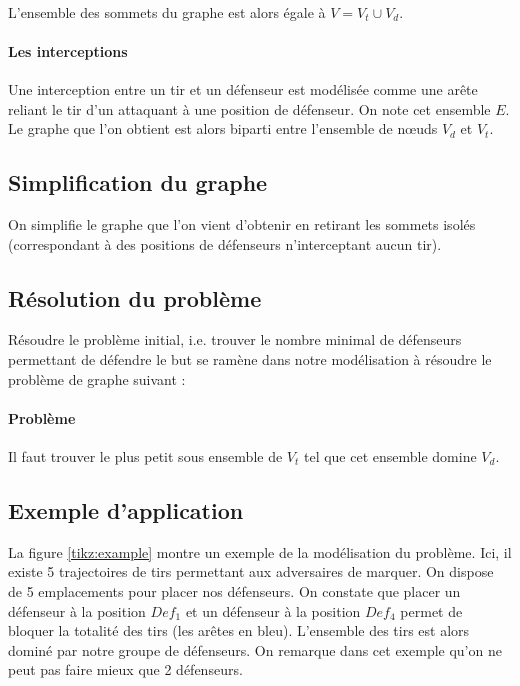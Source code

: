 \documentclass[12pt]{article}
\begin{document}
\paragraph{} L'ensemble des sommets du graphe est alors égale à $V = V_t \cup V_d$.

\paragraph{Les interceptions}
Une interception entre un tir et un défenseur est modélisée comme une arête reliant le tir d'un attaquant à une position de défenseur. On note cet ensemble $E$. Le graphe que l'on obtient est alors biparti entre l'ensemble de n\oe uds $V_d$ et $V_t$.

\subsection{Simplification du graphe}
On simplifie le graphe que l'on vient d'obtenir en retirant les sommets isolés (correspondant à des positions de défenseurs n'interceptant aucun tir).

\subsection{Résolution du problème}
Résoudre le problème initial, i.e. trouver le nombre minimal de défenseurs permettant de défendre le but se ramène dans notre modélisation à résoudre le problème de graphe suivant :

\paragraph{Problème} \textcolor{problem}{Il faut trouver le plus petit sous ensemble de $V_t$ tel que cet ensemble domine $V_d$.}

\subsection{Exemple d'application}

La figure \ref{tikz:example} montre un exemple de la modélisation du problème. Ici, il existe 5 trajectoires de tirs permettant aux adversaires de marquer. On dispose de 5 emplacements pour placer nos défenseurs.  On constate que placer un défenseur à la position $Def_1$ et un défenseur à la position $Def_4$ permet de bloquer la totalité des tirs (les arêtes en bleu). L'ensemble des tirs est alors dominé par notre groupe de défenseurs. On remarque dans cet exemple qu'on ne peut pas faire mieux que 2 défenseurs.
\end{document}
